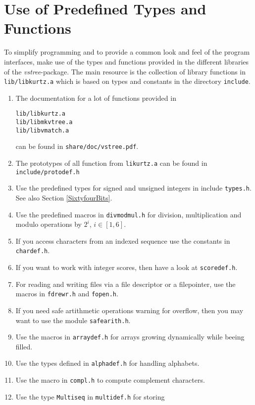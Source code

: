 \documentclass[12pt]{article}
\begin{document}
\section{Use of Predefined Types and Functions}
\label{TypesandFuncs}
To simplify programming and to provide a common look and feel of
the program interfaces, make use of the types and functions
provided in the different libraries of the \emph{vstree}-package. The
main resource is the collection of library functions in \texttt{lib/libkurtz.a}
which is based on types and constants in the directory
\texttt{include}.
\begin{enumerate}
\item
The documentation for a lot of functions provided in
\begin{small}
\begin{verbatim}
lib/libkurtz.a
lib/libmkvtree.a
lib/libvmatch.a
\end{verbatim}
\end{small}
can be found in \texttt{share/doc/vstree.pdf}.
\item
The prototypes of all function from \texttt{likurtz.a} can be found in
\texttt{include/protodef.h}
\item
Use the predefined types for signed and unsigned integers in
include \texttt{types.h}. See also Section \ref{SixtyfourBits}.
\item
Use the predefined macros in \texttt{divmodmul.h} for division,
multiplication and modulo operations by \(2^{i}\), \(i\in[1,6]\).
\item
If you access characters from an indexed sequence use the constants
in \texttt{chardef.h}.
\item
If you want to work with integer scores, then have a look
at \texttt{scoredef.h}.
\item
For reading and writing files via a file descriptor or a
filepointer, use the macros in \texttt{fdrewr.h} and \texttt{fopen.h}.
\item
If you need safe artithmetic operations warning for overflow, then
you may want to use the module \texttt{safearith.h}.
\item
Use the macros in \texttt{arraydef.h} for arrays growing dynamically
while beeing filled.
\item
Use the types defined in \texttt{alphadef.h} for handling
alphabets.
\item
Use the macro in \texttt{compl.h} to compute complement characters.
\item
Use the type \texttt{Multiseq} in \texttt{multidef.h} for storing

\end{enumerate}
\end{document}
